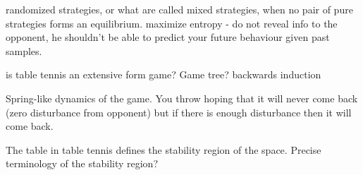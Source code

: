 \documentclass[10pt,a4paper]{article}
\begin{document}
randomized strategies, or what are called mixed strategies, when no pair of pure strategies forms an equilibrium.
maximize entropy - do not reveal info to the opponent, he shouldn't be able to predict your future behaviour given past samples.

is table tennis an extensive form game? Game tree? backwards induction 

Spring-like dynamics of the game. You throw hoping that it will never come back (zero disturbance from opponent) but if there is enough disturbance then it will come back. 

The table in table tennis defines the stability region of the space. Precise terminology of the stability region?


%
%

\end{document}
